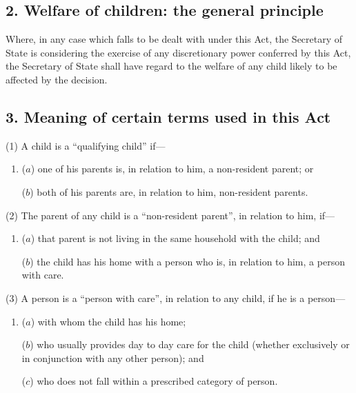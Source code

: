\documentclass[12pt,a4paper]{article}
\begin{document}

\subsection{2. Welfare of children: the general principle}

Where, in any case which falls to be dealt with under this Act, the Secretary of State is considering the exercise of any discretionary power conferred by this
Act, the Secretary of State shall have regard to the welfare of any child likely to be
affected by the decision.


\subsection{3. Meaning of certain terms used in this Act}

(1) A child is a “qualifying child” if---
\begin{enumerate}\item[]
($a$) one of his parents is, in relation to him, a non-resident parent; or

($b$) both of his parents are, in relation to him, non-resident parents.
\end{enumerate}

(2) The parent of any child is a “non-resident parent”, in relation to him, if---

\begin{enumerate}\item[]
($a$)
that parent is not living in the same household with the child; and

($b$)
the child has his home with a person who is, in relation to him, a person
with care.
\end{enumerate}

(3)
A person is a “person with care”, in relation to any child, if he is a person---
\begin{enumerate}\item[]
($a$)
with whom the child has his home;

($b$)
who usually provides day to day care for the child (whether exclusively
or in conjunction with any other person); and

($c$)
who does not fall within a prescribed category of person.
\end{enumerate}
\end{document}
